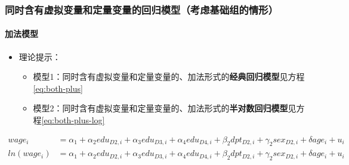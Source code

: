 \documentclass[12pt,(landscape,a4paper),(portrait,a4paper)]{article}
\providecommand{\tightlist}{%
  \setlength{\itemsep}{0pt}\setlength{\parskip}{0pt}}
\let\oldparagraph\paragraph
\renewcommand{\paragraph}[1]{\oldparagraph{#1}\mbox{}}
\theoremstyle{definition}
\theoremstyle{definition}
\theoremstyle{definition}
\theoremstyle{remark}
\begin{document}
\hypertarget{group2}{%
\subsubsection{同时含有虚拟变量和定量变量的回归模型（考虑基础组的情形）}\label{group2}}

\hypertarget{-1}{%
\paragraph{加法模型}\label{-1}}

\begin{itemize}
\tightlist
\item
  理论提示：

  \begin{itemize}
  \tightlist
  \item
    模型1：同时含有虚拟变量和定量变量的、加法形式的\textbf{经典回归模型}见方程\eqref{eq:both-plus}
  \item
    模型2：同时含有虚拟变量和定量变量的、加法形式的\textbf{半对数回归模型}见方程\eqref{eq:both-plus-log}
  \end{itemize}
\end{itemize}

\begin{align}
wage_i & =\alpha_1+\alpha_2edu_{D2,i}+\alpha_3edu_{D3,i}+\alpha_4edu_{D4,i}+\beta_2 dpt_{D2,i}+\gamma_2 sex_{D2,i}+\delta age_i+u_i   \label{eq:both-plus} \\
ln(wage_i) & =\alpha_1+\alpha_2edu_{D2,i}+\alpha_3edu_{D3,i}+\alpha_4edu_{D4,i}+\beta_2 dpt_{D2,i}+\gamma_2 sex_{D2,i}+\delta age_i+u_i  \label{eq:both-plus-log}
\end{align}
\end{document}
